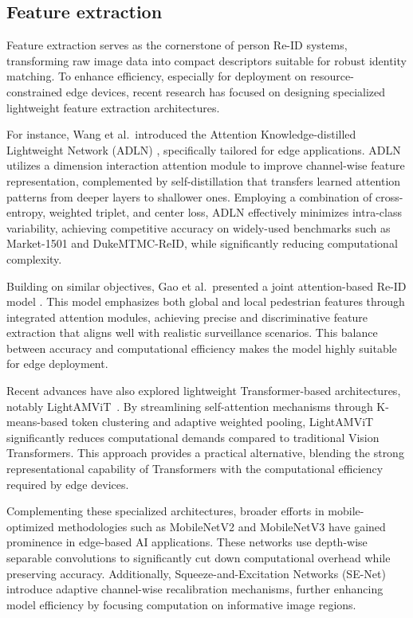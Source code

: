 \documentclass[../main.tex]{subfiles}
\begin{document}
\subsection{Feature extraction}
\label{sec:feature_extraction}

Feature extraction serves as the cornerstone of person Re-ID systems, transforming raw image data into compact descriptors suitable for robust identity matching. To enhance efficiency, especially for deployment on resource-constrained edge devices, recent research has focused on designing specialized lightweight feature extraction architectures.

For instance, Wang et al.~introduced the Attention Knowledge-distilled Lightweight Network (ADLN) \cite{adln}, specifically tailored for edge applications. ADLN utilizes a dimension interaction attention module to improve channel-wise feature representation, complemented by self-distillation that transfers learned attention patterns from deeper layers to shallower ones. Employing a combination of cross-entropy, weighted triplet, and center loss, ADLN effectively minimizes intra-class variability, achieving competitive accuracy on widely-used benchmarks such as Market-1501 and DukeMTMC-ReID, while significantly reducing computational complexity.

Building on similar objectives, Gao et al.~presented a joint attention-based Re-ID model \cite{jointattention}. This model emphasizes both global and local pedestrian features through integrated attention modules, achieving precise and discriminative feature extraction that aligns well with realistic surveillance scenarios. This balance between accuracy and computational efficiency makes the model highly suitable for edge deployment.

Recent advances have also explored lightweight Transformer-based architectures, notably LightAMViT~\cite{lightamvit}. By streamlining self-attention mechanisms through K-means-based token clustering and adaptive weighted pooling, LightAMViT significantly reduces computational demands compared to traditional Vision Transformers. This approach provides a practical alternative, blending the strong representational capability of Transformers with the computational efficiency required by edge devices.

Complementing these specialized architectures, broader efforts in mobile-optimized methodologies such as MobileNetV2 \cite{sandler2019mobilenetv2invertedresidualslinear} and MobileNetV3 \cite{howard2019searchingmobilenetv3} have gained prominence in edge-based AI applications. These networks use depth-wise separable convolutions to significantly cut down computational overhead while preserving accuracy. Additionally, Squeeze-and-Excitation Networks (SE-Net) \cite{hu2019squeezeandexcitationnetworks} introduce adaptive channel-wise recalibration mechanisms, further enhancing model efficiency by focusing computation on informative image regions.
\end{document}
